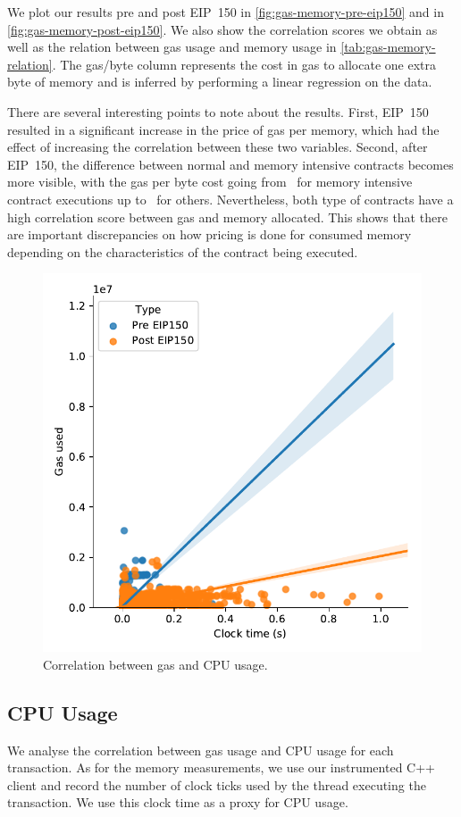 We plot our results pre and post EIP~150 in \autoref{fig:gas-memory-pre-eip150} and in \autoref{fig:gas-memory-post-eip150}. We also show the correlation scores we obtain as well as the relation between gas usage and memory usage in \autoref{tab:gas-memory-relation}. The gas/byte column represents the cost in gas to allocate one extra byte of memory and is inferred by performing a linear regression on the data.

There are several interesting points to note about the results. First, EIP~150 resulted in a significant increase in the price of gas per memory, which had the effect of increasing the correlation between these two variables. Second, after EIP~150, the difference between normal and memory intensive contracts becomes more visible, with the gas per byte cost going from~ for memory intensive contract executions up to~ for others. Nevertheless, both type of contracts have a high correlation score between gas and memory allocated. This shows that there are important discrepancies on how pricing is done for consumed memory depending on the characteristics of the contract being executed.

\begin{figure}[tb]
  \centering\includegraphics[width=.8\columnwidth]{figures/cpu-usage-1400000-1500000--2500000-2600000.pdf}
  \caption{Correlation between gas and CPU usage.}
  \label{fig:gas-cpu}
\end{figure}

\subsection{CPU Usage}
We analyse the correlation between gas usage and CPU usage for each transaction. As for the memory measurements, we use our instrumented C++ client and record the number of clock ticks used by the thread executing the transaction. We use this clock time as a proxy for CPU usage.


